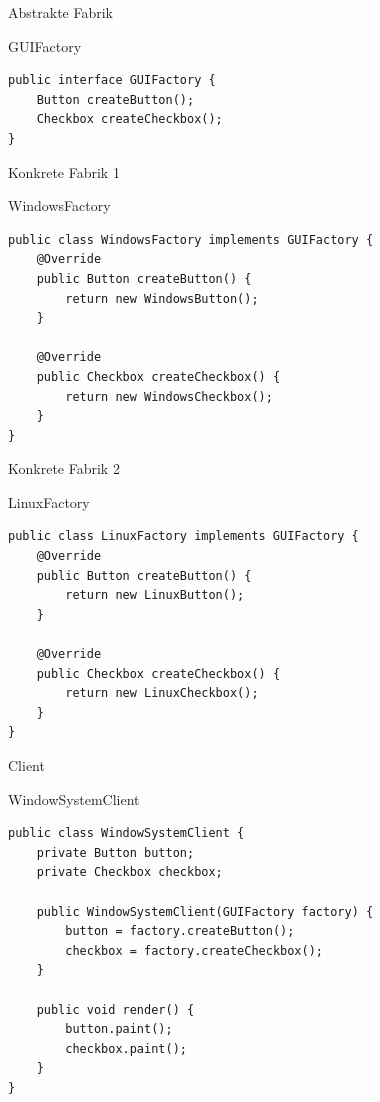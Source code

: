 \begin{frame}[fragile]{Abstrakte Fabrik}
	\begin{exampleblock}{GUIFactory}
 		\begin{lstlisting}
public interface GUIFactory {
    Button createButton();
    Checkbox createCheckbox();
}
        \end{lstlisting}
 	\end{exampleblock}
\end{frame}

\begin{frame}[fragile]{Konkrete Fabrik 1}
	\begin{exampleblock}{WindowsFactory}
 		\begin{lstlisting}
public class WindowsFactory implements GUIFactory {
    @Override
    public Button createButton() {
        return new WindowsButton();
    }

    @Override
    public Checkbox createCheckbox() {
        return new WindowsCheckbox();
    }
}
        \end{lstlisting}
 	\end{exampleblock}
\end{frame}

\begin{frame}[fragile]{Konkrete Fabrik 2}
	\begin{exampleblock}{LinuxFactory}
 		\begin{lstlisting}
public class LinuxFactory implements GUIFactory {
    @Override
    public Button createButton() {
        return new LinuxButton();
    }

    @Override
    public Checkbox createCheckbox() {
        return new LinuxCheckbox();
    }
}
        \end{lstlisting}
 	\end{exampleblock}
\end{frame}

\begin{frame}[fragile]{Client}
	\begin{exampleblock}{WindowSystemClient}
 		\begin{lstlisting}
public class WindowSystemClient {
    private Button button;
    private Checkbox checkbox;

    public WindowSystemClient(GUIFactory factory) {
        button = factory.createButton();
        checkbox = factory.createCheckbox();
    }

    public void render() {
        button.paint();
        checkbox.paint();
    }
}
        \end{lstlisting}
 	\end{exampleblock}
\end{frame}


